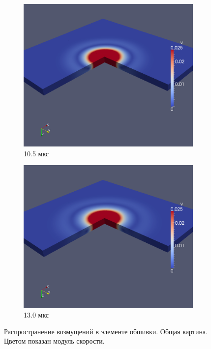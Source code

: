 \begin{figure}[htp]
\begin{subfigure}[b]{0.5\textwidth}
\centering
\includegraphics[width=\textwidth]{png/pkm-experiment/wing-only/wave-3d/v-0017.png}
\caption{10.5 мкс}
\end{subfigure}
\begin{subfigure}[b]{0.5\textwidth}
\centering
\includegraphics[width=\textwidth]{png/pkm-experiment/wing-only/wave-3d/v-0021.png}
\caption{13.0 мкс}
\end{subfigure}
\caption{Распространение возмущений в элементе обшивки. Общая картина. Цветом показан модуль скорости.}
\label{pic:pkm_experiment_v3d_wing_only}
\end{figure}


